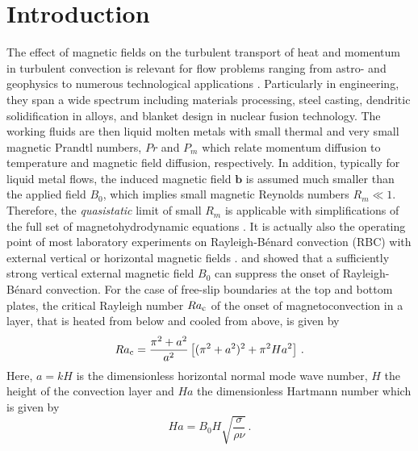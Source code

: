 \documentclass{jfm}
\begin{document}
\section{Introduction}
The effect of magnetic fields on the turbulent transport of heat and momentum in turbulent convection is relevant for flow problems 
ranging from astro- and geophysics \citep{rudiger2013,Weiss2014} to numerous technological applications \citep{Davidson2016}. 
Particularly in engineering, they span a wide spectrum including materials processing,  steel casting, dendritic solidification in alloys, 
and blanket design in nuclear fusion technology.  The working fluids are then liquid molten metals with small thermal and very small 
magnetic Prandtl numbers, $Pr$ and $P_m$ which relate momentum diffusion to temperature and magnetic field diffusion, respectively. 
In addition, typically for liquid metal flows, the induced magnetic field $\bm{b}$ is assumed much smaller than the applied field $B_0$, 
which implies small magnetic Reynolds numbers $R_m \ll 1$. Therefore, the {\em quasistatic} limit of small $R_m$ is applicable with simplifications 
of the full set of magnetohydrodynamic equations \citep{Knaepen2008,Davidson2016}. It is actually also the operating point of most 
laboratory experiments on Rayleigh-B\'{e}nard convection (RBC) with external vertical \citep{Cioni2000,Burr2001,Aurnou2001} or 
horizontal magnetic fields  \citep{Fauve1981,Tasaka2016,Vogt2018}. \cite{Nakagawa1955} and \cite{Chandrasekhar1961} showed that a 
sufficiently strong vertical external magnetic field $B_0$ can suppress the onset of Rayleigh-B\'{e}nard convection. For the case of free-slip 
boundaries at the top and bottom plates, the critical Rayleigh number $Ra_{\rm c}$ of the onset of magnetoconvection in a layer, that is heated 
from below and cooled from above, is given by 
\begin{equation}
Ra_{\rm c}=\frac{\pi^2+a^2}{a^2}\left[(\pi^2+a^2)^2+\pi^2Ha^2\right]\,.
\label{Chandra}
\end{equation}
Here, $a=kH$ is the dimensionless horizontal normal mode wave number, $H$ the height of the convection layer and  $Ha$  
the dimensionless Hartmann number which is given by 
\begin{equation}
Ha=B_0 H \sqrt{\frac{\sigma}{\rho\nu}} \,.
\end{equation}
\end{document}
